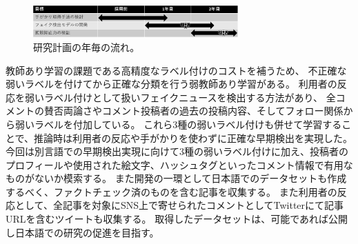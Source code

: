 \setlength\intextsep{0pt}
\setlength\textfloatsep{0pt}
\begin{figure}
    \centering
    \includegraphics[width=0.7\textwidth]{figs/plan.pdf}
    \vspace{-1cm} 
    \caption{研究計画の年毎の流れ。}
    \label{fig:plan}
\end{figure}
教師あり学習の課題である高精度なラベル付けのコストを補うため、
不正確な弱いラベルを付けてから正確な分類を行う弱教師あり学習がある。
利用者の反応を弱いラベル付けとして扱いフェイクニュースを検出する方法があり\cite{shu2020leveraging}、
全コメントの賛否両論さやコメント投稿者の過去の投稿内容、そしてフォロー関係から弱いラベルを付加している。
これら3種の弱いラベル付けも併せて学習することで、推論時は利用者の反応や手がかりを使わずに正確な早期検出を実現した。
今回は別言語での早期検出実現に向けて3種の弱いラベル付けに加え、投稿者のプロフィールや使用された絵文字、ハッシュタグといったコメント情報で有用なものがないか模索する。
また開発の一環として日本語でのデータセットも作成するべく、ファクトチェック済のものを含む記事を収集する。
また利用者の反応として、全記事を対象にSNS上で寄せられたコメントとしてTwitterにて記事URLを含むツイートも収集する。
取得したデータセットは、可能であれば公開し日本語での研究の促進を目指す。

